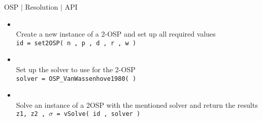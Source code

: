 %
% 
\begin{frame}{OSP $\mid$ Resolution $\mid$ API}

\begin{itemize}
\item  {}\\
          Create a new instance of a 2-OSP and set up all required values    \\
           \texttt{id = \texttt{{set2OSP}( n , p , d , r , w ) }} 
           \medskip
\item  {} \\
          Set up the solver to use for the 2-OSP\\
          \texttt{solver = OSP\_VanWassenhove1980( ) }
          \medskip
\item  {}\\
          Solve an instance of a 2OSP with the mentioned solver and return the results \\
          \texttt{z1, z2 , $\sigma$ = vSolve( id , solver ) }
          \medskip
\end{itemize}

\end{frame}

